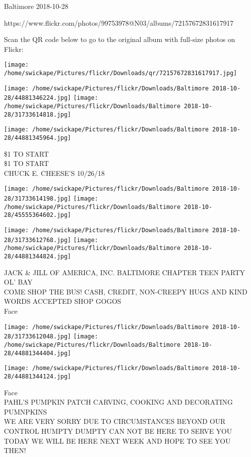 \documentclass[10pt,letterpaper]{article}
\begin{document}
Baltimore 2018-10-28

https://www.flickr.com/photos/99753978@N03/albums/72157672831617917

Scan the QR code below to go to the original album with full-size photos on Flickr:

\texttt{[image: /home/swickape/Pictures/flickr/Downloads/qr/72157672831617917.jpg]}
\pagebreak

\texttt{[image: /home/swickape/Pictures/flickr/Downloads/Baltimore 2018-10-28/44881346224.jpg]}
\texttt{[image: /home/swickape/Pictures/flickr/Downloads/Baltimore 2018-10-28/31733614818.jpg]}

\vspace{0.25in}
\texttt{[image: /home/swickape/Pictures/flickr/Downloads/Baltimore 2018-10-28/44881345964.jpg]}

\$1 TO START\\
\$1 TO START\\
CHUCK E. CHEESE'S 10/26/18\\
\pagebreak

\texttt{[image: /home/swickape/Pictures/flickr/Downloads/Baltimore 2018-10-28/31733614198.jpg]}
\texttt{[image: /home/swickape/Pictures/flickr/Downloads/Baltimore 2018-10-28/45555364602.jpg]}

\texttt{[image: /home/swickape/Pictures/flickr/Downloads/Baltimore 2018-10-28/31733612768.jpg]}
\texttt{[image: /home/swickape/Pictures/flickr/Downloads/Baltimore 2018-10-28/44881344824.jpg]}

JACK \& JILL OF AMERICA, INC. BALTIMORE CHAPTER TEEN PARTY\\
OL' BAY\\
COME SHOP THE BUS!  CASH, CREDIT, NON{-}CREEPY HUGS AND KIND WORDS ACCEPTED SHOP GOGOS\\
Face\\
\pagebreak

\texttt{[image: /home/swickape/Pictures/flickr/Downloads/Baltimore 2018-10-28/31733612048.jpg]}
\texttt{[image: /home/swickape/Pictures/flickr/Downloads/Baltimore 2018-10-28/44881344404.jpg]}

\texttt{[image: /home/swickape/Pictures/flickr/Downloads/Baltimore 2018-10-28/44881344124.jpg]}

Face\\
PAHL'S PUMPKIN PATCH CARVING, COOKING AND DECORATING PUMNPKINS\\
WE ARE VERY SORRY DUE TO CIRCUMSTANCES BEYOND OUR CONTROL HUMPTY DUMPTY CAN NOT BE HERE TO SERVE YOU TODAY WE WILL BE HERE NEXT WEEK AND HOPE TO SEE YOU THEN!\\
\pagebreak
\end{document}
